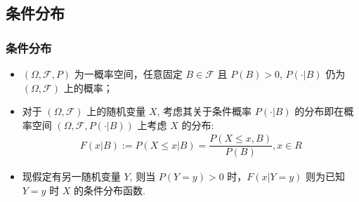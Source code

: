 { 
	\begin{frame}
		\titlepage
	\end{frame}
}
\subsection{条件分布}
\begin{frame}
	\frametitle{条件分布}
	\begin{itemize}[<+-|alert@+>]
		\item $(\Omega,\mathcal{F},P)$ 为一概率空间，任意固定 $B\in\mathcal{F}$ 且 $P (B)>0$, $P (\cdot|B)$ 仍为 $(\Omega,\mathcal{F})$ 上的概率；
		\item 对于 $(\Omega,\mathcal{F})$ 上的随机变量 $X$, 考虑其关于条件概率 $P (\cdot|B)$ 的分布即在概率空间 $(\Omega,\mathcal{F},P (\cdot|B))$ 上考虑 $X$ 的分布:
		\begin{eqnarray*}
			F(x|B):=P(X\le x|B)=\dfrac{P(X\le x, B)}{P(B)}, x\in R
		\end{eqnarray*}
		\item 现假定有另一随机变量 $Y$, 则当 $P (Y=y)>0$ 时，$F (x|Y=y)$ 则为已知 $Y=y$ 时 $X$ 的条件分布函数.
	\end{itemize}

\end{frame}


